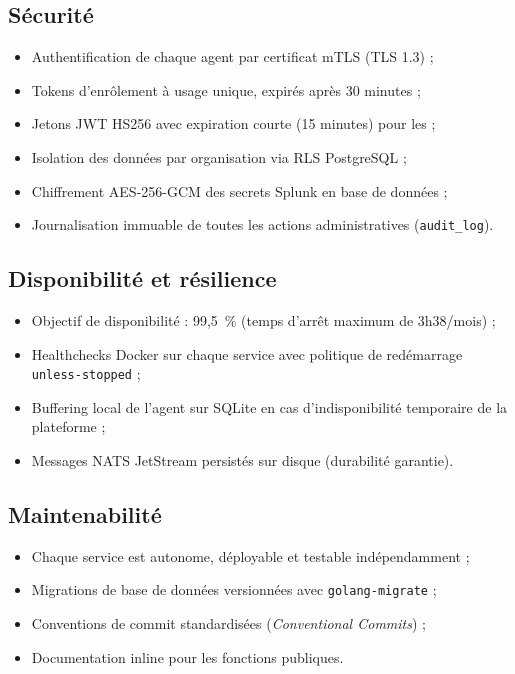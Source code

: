 \subsection{Sécurité}

\begin{itemize}
  \item Authentification de chaque agent par certificat mTLS (TLS 1.3) ;
  \item Tokens d'enrôlement à usage unique, expirés après 30 minutes ;
  \item Jetons JWT HS256 avec expiration courte (15 minutes) pour les \api{} ;
  \item Isolation des données par organisation via RLS PostgreSQL ;
  \item Chiffrement AES-256-GCM des secrets Splunk en base de données ;
  \item Journalisation immuable de toutes les actions administratives (\texttt{audit\_log}).
\end{itemize}

\subsection{Disponibilité et résilience}

\begin{itemize}
  \item Objectif de disponibilité : 99,5~\% (temps d'arrêt maximum de 3h38/mois) ;
  \item Healthchecks Docker sur chaque service avec politique de redémarrage
    \texttt{unless-stopped} ;
  \item Buffering local de l'agent sur SQLite en cas d'indisponibilité temporaire
    de la plateforme ;
  \item Messages NATS JetStream persistés sur disque (durabilité garantie).
\end{itemize}

\subsection{Maintenabilité}

\begin{itemize}
  \item Chaque service est autonome, déployable et testable indépendamment ;
  \item Migrations de base de données versionnées avec \texttt{golang-migrate} ;
  \item Conventions de commit standardisées (\textit{Conventional Commits}) ;
  \item Documentation inline pour les fonctions publiques.
\end{itemize}


